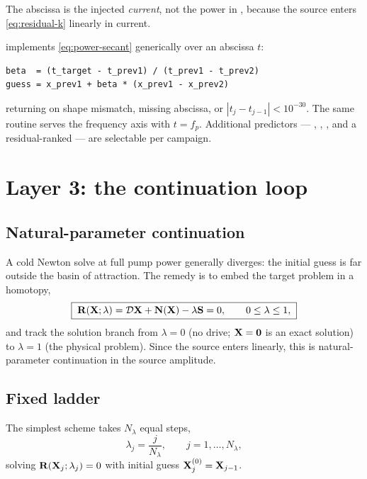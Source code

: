 The abscissa is the injected \emph{current}, not the power in \si{\dBm},
because the source enters \eqref{eq:residual-k} linearly in current.

\begin{implnote}
 implements \eqref{eq:power-secant} generically over an
abscissa $t$:
\begin{lstlisting}
beta  = (t_target - t_prev1) / (t_prev1 - t_prev2)
guess = x_prev1 + beta * (x_prev1 - x_prev2)
\end{lstlisting}
returning  on shape mismatch, missing abscissa, or
$|t_{j}-t_{j-1}|<10^{-30}$. The same routine serves the frequency axis with
$t=f_p$. Additional predictors --- , , ,
and a residual-ranked  --- are selectable per campaign.
\end{implnote}

\section{Layer 3: the continuation loop}
\label{sec:continuation}

\subsection{Natural-parameter continuation}

A cold Newton solve at full pump power generally diverges: the initial guess is
far outside the basin of attraction. The remedy is to embed the target problem
in a homotopy,
\begin{equation}
  \boxed{\;
  \mathbf{R}(\mathbf{X};\lambda) = \mathcal{D}\mathbf{X} + \mathbf{N}(\mathbf{X}) - \lambda\mathbf{S} = 0,
  \qquad 0\le\lambda\le 1,
  \;}
  \label{eq:homotopy}
\end{equation}
and track the solution branch from $\lambda=0$ (no drive; $\mathbf{X}=\mathbf{0}$ is an
exact solution) to $\lambda=1$ (the physical problem). Since the source enters
linearly, this is natural-parameter continuation in the source amplitude.

\subsection{Fixed ladder}

The simplest scheme takes $N_\lambda$ equal steps,
\begin{equation}
  \lambda_j = \frac{j}{N_\lambda},\qquad j=1,\dots,N_\lambda,
\end{equation}
solving $\mathbf{R}(\mathbf{X}_j;\lambda_j)=0$ with initial guess
$\mathbf{X}_j^{(0)} = \mathbf{X}_{j-1}$.


